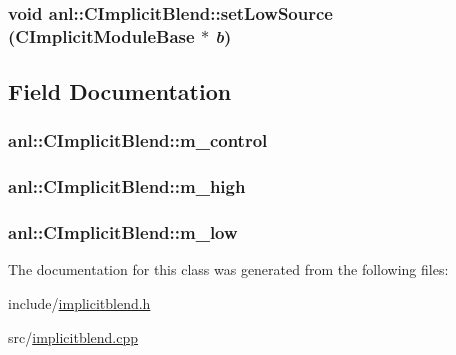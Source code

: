 \label{classanl_1_1CImplicitBlend_a683d50ea2c9852cab8737158e22a478b}
\hypertarget{classanl_1_1CImplicitBlend_a1336590cf2e56460e1d6f574cacefc78}{
\subsubsection[{setLowSource}]{\setlength{\rightskip}{0pt plus 5cm}void anl::CImplicitBlend::setLowSource ({\bf CImplicitModuleBase} $\ast$ {\em b})}}
\label{classanl_1_1CImplicitBlend_a1336590cf2e56460e1d6f574cacefc78}


\subsection{Field Documentation}
\hypertarget{classanl_1_1CImplicitBlend_aaa683ecf2fdc69454c27b9437e54b1b6}{
\subsubsection[{m\_\-control}]{ {\bf anl::CImplicitBlend::m\_\-control}}}
\label{classanl_1_1CImplicitBlend_aaa683ecf2fdc69454c27b9437e54b1b6}
\hypertarget{classanl_1_1CImplicitBlend_a7d9ed78bd768066bb4af97f7bfc8e1aa}{
\subsubsection[{m\_\-high}]{ {\bf anl::CImplicitBlend::m\_\-high}}}
\label{classanl_1_1CImplicitBlend_a7d9ed78bd768066bb4af97f7bfc8e1aa}
\hypertarget{classanl_1_1CImplicitBlend_ae9ee878c842a67b1128096d7c6617693}{
\subsubsection[{m\_\-low}]{ {\bf anl::CImplicitBlend::m\_\-low}}}
\label{classanl_1_1CImplicitBlend_ae9ee878c842a67b1128096d7c6617693}


The documentation for this class was generated from the following files:\begin{DoxyCompactItemize}
\item 
include/\hyperlink{implicitblend_8h}{implicitblend.h}\item 
src/\hyperlink{implicitblend_8cpp}{implicitblend.cpp}\end{DoxyCompactItemize}
